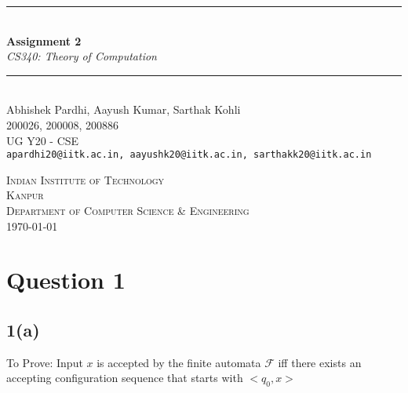 \documentclass[12pt,a4paper]{article}
\newcommand{\HRule}{\rule{\linewidth}{0.5mm}}
\begin{document}
\begin{titlepage}
\begin{center}



\HRule \\[0.4cm]
{ \LARGE 
  \textbf{Assignment 2}\\[0.4cm]
  \emph{CS340: Theory of Computation}\\[0.4cm]
}
\HRule \\[1.5cm]



{ \large
  Abhishek Pardhi, Aayush Kumar, Sarthak Kohli\\[0.1cm]
  200026, 200008, 200886\\[0.1cm]
  UG Y20 - CSE\\[0.1cm]
  \texttt{apardhi20@iitk.ac.in, aayushk20@iitk.ac.in, sarthakk20@iitk.ac.in}
}

\vfill

\textsc{\Large Indian Institute of Technology\\Kanpur}\\[0.4cm]
\textsc{\large Department of Computer Science \& Engineering }\\[0.4cm]


{\large \today}
 
\end{center}
\end{titlepage}



\newpage



\tableofcontents
{}
\newpage
\setcounter{page}{1}

\section{Question 1}

\subsection{1(a)} To Prove: Input $x$ is accepted by the finite automata $\mathcal{F}$ iff there exists an accepting configuration sequence that starts with $<q_0,x>$
\end{document}
